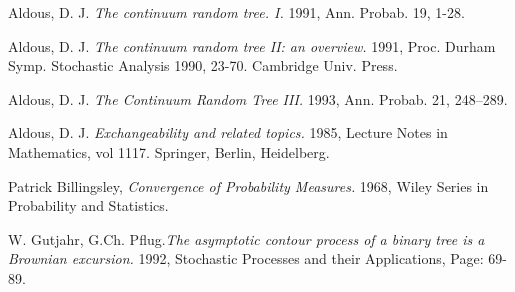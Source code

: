 \documentclass[11pt, twoside]{report}
\theoremstyle{definition}
\theoremstyle{plain}
\theoremstyle{remark}
\numberwithin{equation}{chapter}
\begin{document}
\begin{thebibliography}{9}

\begin{comment} %
\bibitem{Bahouri} 
H. Bahouri, J.-Y. Chemin, and R. Danchin.
\textit{Fourier analysis and nonlinear partial differential equations}. 
Springer, Heidelberg, 2011.
\end{comment}

 Aldous, D. J. \textit{The continuum random tree. I.} 1991, Ann. Probab. 19, 1-28.

 Aldous, D. J. \textit{The continuum random tree II: an overview.} 1991, Proc. Durham Symp. Stochastic Analysis 1990, 23-70. Cambridge Univ. Press.

 Aldous, D. J.  \textit{The Continuum Random Tree III.} 1993, Ann. Probab. 21, 248--289.

 Aldous, D. J. \textit{Exchangeability and related topics.} 1985, Lecture Notes in Mathematics, vol 1117. Springer, Berlin, Heidelberg.

 Patrick Billingsley, \textit{Convergence of Probability Measures.} 1968, Wiley Series in Probability and Statistics.

 W. Gutjahr, G.Ch. Pflug.\textit{The asymptotic contour process of a binary tree is a Brownian excursion.} 1992, Stochastic Processes and their Applications, Page: 69-89.
 


	

\end{thebibliography}
\end{document}
